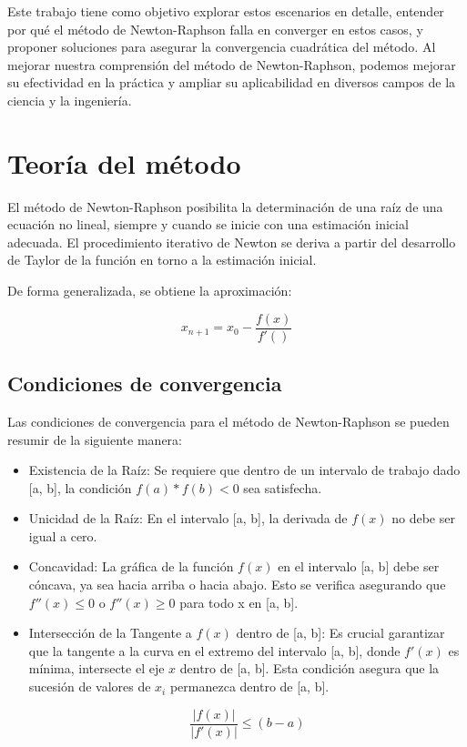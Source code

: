\documentclass[conference]{IEEEtran}
\begin{document}
Este trabajo tiene como objetivo explorar estos escenarios en detalle,
entender por qué el método de Newton-Raphson falla en converger en estos
casos, y proponer soluciones para asegurar la convergencia cuadrática del
método. Al mejorar nuestra comprensión del método de Newton-Raphson, podemos
mejorar su efectividad en la práctica y ampliar su aplicabilidad en diversos
campos de la ciencia y la ingeniería.

\nocite{bolivar2005metodo}

\nocite{canterometodo}

\section{Teoría del método}

El método de Newton-Raphson posibilita la determinación de una raíz de una
ecuación no lineal, siempre y cuando se inicie con una estimación
inicial adecuada. El procedimiento iterativo de Newton se deriva a partir
del desarrollo de Taylor de la función en torno a la estimación inicial.

De forma generalizada, se obtiene la aproximación:

\begin{equation}
	x_{n + 1} = x_0 - \frac{f(x)}{f'()}
\end{equation}

\subsection{Condiciones de convergencia}

Las condiciones de convergencia para el método de Newton-Raphson se pueden
resumir de la siguiente manera:

\begin{itemize}
	\item Existencia de la Raíz: Se requiere que dentro de un intervalo
	      de trabajo dado [a, b], la condición $f(a) * f(b) < 0$ sea satisfecha.

	\item Unicidad de la Raíz:
	      En el intervalo [a, b], la derivada de $f(x)$ no debe ser igual a cero.

	\item Concavidad: La gráfica de la función $f(x)$ en el intervalo [a, b]
	      debe ser cóncava, ya sea hacia arriba o hacia abajo. Esto se verifica
	      asegurando que $f''(x) \leqslant 0$ o $f''(x) \geqslant 0$ para todo x en [a, b].

	\item Intersección de la Tangente a $f(x)$ dentro de [a, b]:
	      Es crucial garantizar que la tangente a la curva en el extremo del
	      intervalo [a, b], donde $f'(x)$ es mínima, intersecte el eje $x$
	      dentro de [a, b]. Esta condición asegura que la sucesión de
	      valores de $x_i$ permanezca dentro de [a, b].

	      \begin{equation*}
		      \frac{\left\lvert f(x) \right\rvert }{\left\lvert f'(x) \right\rvert} \leqslant (b - a)
	      \end{equation*}
\end{itemize}
\end{document}
